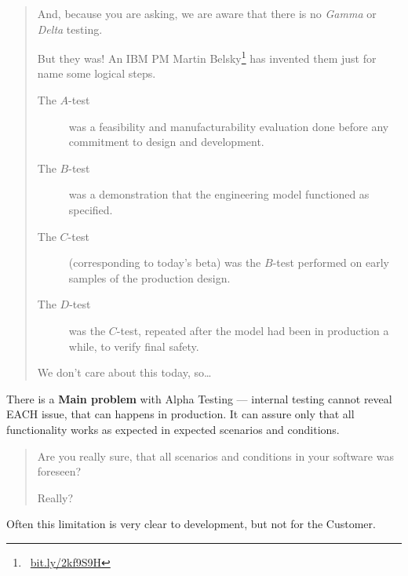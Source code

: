 \begin{quote}
And, because you are asking, we are aware that there is no \emph{Gamma} or \emph{Delta} testing. 

But they was! An IBM PM Martin Belsky\footnote{~\href{http://bit.ly/2kf9S9H}{bit.ly/2kf9S9H}} has invented them just for name some logical steps.

\begin{description}
\item[The $A$-test] was a feasibility and manufacturability evaluation done before any commitment to design and development.

\item[The $B$-test] was a demonstration that the engineering model functioned as specified. 

\item[The $C$-test] (corresponding to today's beta) was the $B$-test performed on early samples of the production design.

\item[The $D$-test] was the $C$-test, repeated after the model had been in production a while, to verify final safety.                                                                                                               \end{description}

We don't care about this today, so\ldots
\end{quote}

There is a \textbf{Main problem} with Alpha Testing — internal testing cannot reveal EACH issue, that can happens in production. It can assure only that all functionality works as expected in expected scenarios and conditions.

\begin{quote}
Are you really sure, that all scenarios and conditions in your software was foreseen?

Really?
\end{quote} 

Often this limitation is very clear to development, but not for the Customer.
